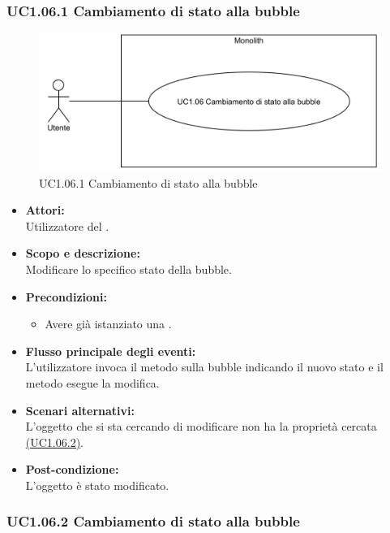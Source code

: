 \subsubsection{UC1.06.1 Cambiamento di stato alla bubble} \label{UC1.06.1}

\begin{figure}[H]
	\centering
	\includegraphics[width=15cm]{../../documenti/AnalisiDeiRequisiti/Diagrammi_img/uc1_06.png}
	\caption{UC1.06.1 Cambiamento di stato alla bubble}
\end{figure}

\begin{itemize}
	\item \textbf{Attori:}
	\\Utilizzatore del .
	\item \textbf{Scopo e descrizione:} 
	\\Modificare lo specifico stato della bubble.
	\item \textbf{Precondizioni:}
	\begin{itemize}
		\item Avere già istanziato una .
	\end{itemize}
	\item \textbf{Flusso principale degli eventi:}
	\\L’utilizzatore invoca il metodo sulla bubble indicando il nuovo stato e il metodo esegue la modifica.
	\item \textbf{Scenari alternativi:}
	\\L'oggetto che si sta cercando di modificare non ha la proprietà cercata \hyperref[UC1.06.2]{(UC1.06.2)}.
	\item \textbf{Post-condizione:}
	\\L'oggetto è stato modificato.
\end{itemize}

\subsubsection{UC1.06.2 Cambiamento di stato alla bubble} \label{UC1.06.2}

